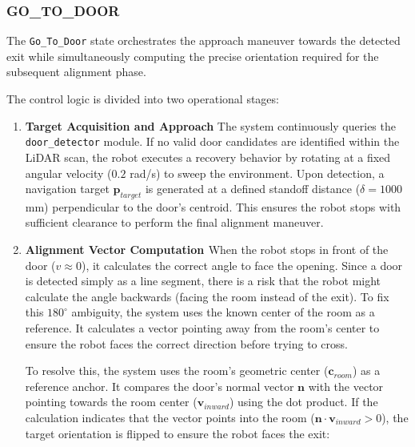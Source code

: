 \documentclass[conference]{IEEEtran}
\begin{document}
    \subsubsection{GO\_TO\_DOOR}
    The \texttt{Go\_To\_Door} state orchestrates the approach maneuver towards the detected exit while simultaneously computing the precise orientation required for the subsequent alignment phase.
    
    The control logic is divided into two operational stages:
    \begin{enumerate}
    \item \textbf{Target Acquisition and Approach}
    The system continuously queries the \texttt{door\_detector} module. If no valid door candidates are identified within the LiDAR scan, the robot executes a recovery behavior by rotating at a fixed angular velocity ($0.2$ rad/s) to sweep the environment.
    Upon detection, a navigation target $\mathbf{p}_{target}$ is generated at a defined standoff distance ($\delta = 1000$ mm) perpendicular to the door's centroid. This ensures the robot stops with sufficient clearance to perform the final alignment maneuver.
    
    \item \textbf{Alignment Vector Computation \cite{sanderson2016dot}}
    When the robot stops in front of the door ($v \approx 0$), it calculates the correct angle to face the opening. Since a door is detected simply as a line segment, there is a risk that the robot might calculate the angle backwards (facing the room instead of the exit). To fix this $180^\circ$ ambiguity, the system uses the known center of the room as a reference. It calculates a vector pointing away from the room's center to ensure the robot faces the correct direction before trying to cross.

    To resolve this, the system uses the room's geometric center ($\mathbf{c}_{room}$) as a reference anchor. It compares the door's normal vector $\mathbf{n}$ with the vector pointing towards the room center ($\mathbf{v}_{inward}$) using the dot product. If the calculation indicates that the vector points into the room ($\mathbf{n} \cdot \mathbf{v}_{inward} > 0$), the target orientation is flipped to ensure the robot faces the exit:
    

\end{enumerate}
\end{document}
